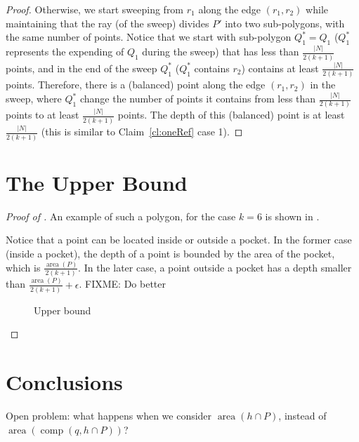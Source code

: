 \documentclass{article}
\DeclareMathOperator{\area}{area}
\DeclareMathOperator{\comp}{comp}
\begin{document}
\begin{proof}
Otherwise, we start sweeping from $r_1$ along the edge $(r_1,r_2)$ 
while maintaining that the ray (of the sweep) divides $P'$ into two sub-polygons, 
with the same number of points. 
Notice that we start with sub-polygon $Q_1^*=Q_1$ ($Q_1^*$ represents the expending of $Q_1$ during the sweep)
that has less than $\frac{|N|}{2(k+1)}$ points, and in the end of the sweep 
$Q_1^*$  ($Q_1^*$ contains $r_2$)
contains at least $\frac{|N|}{2(k+1)}$ points. 
Therefore, there is a (balanced) point along the edge $(r_1,r_2)$ in the sweep,
where $Q_1^*$ change the number of points 
it contains from less than $\frac{|N|}{2(k+1)}$ points to at least $\frac{|N|}{2(k+1)}$ points.
The depth of this (balanced) point is at least $\frac{|N|}{2(k+1)}$ 
%
%
(this is similar to Claim~\ref{cl:oneRef} case 1). 

\end{proof}





\section{The Upper Bound}

\begin{proof}[Proof of ]
An example of such a polygon, for the case $k=6$ is shown in
. 

Notice that a point can be located inside or outside a pocket. 
In the former case (inside a pocket), the depth of a point is bounded
by the area of the pocket, which is $\frac{\area(P)}{2(k+1)}$.
In the later case, a point outside a pocket
has a depth smaller than $\frac{\area(P)}{2(k+1)} + \epsilon$. 
FIXME: Do better
\begin{figure}
   \begin{center}
   \end{center}
   \caption{Upper bound}
 \label{fig:k4}
\end{figure}

\end{proof}

\section{Conclusions}

Open problem: what happens when we consider $\area(h\cap P)$, instead
of $\area(\comp(q,h\cap P))$?
\end{document}
